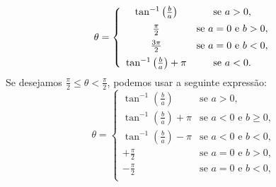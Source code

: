 \begin{equation}
\theta=\left\{\begin{array}{cc}\tan^{-1}\left(\frac{b}{a}\right)&\hbox{se}\ a>0, \\[5pt]
\frac{\pi}{2}&\hbox{se}\ a=0\ \hbox{e}\ b>0, \\[5pt]
\frac{3\pi}{2}&\hbox{se}\ a=0\ \hbox{e}\ b<0,  \\[5pt] 
\tan^{-1}\left(\frac{b}{a}\right)+\pi&\hbox{se}\ a<0.
\end{array}\right.
\end{equation}
Se desejamos $\frac{\pi}{2}\leq \theta < \frac{\pi}{2}$, podemos usar a seguinte expressão:
\begin{equation}\theta=\begin{cases}
\tan^{-1}(\frac b a) &\text{se } a > 0, \\[5pt]
\tan^{-1}(\frac b a) + \pi &\text{se } a < 0 \text{ e } b \ge 0, \\[5pt]
\tan^{-1}(\frac b a) - \pi &\text{se } a < 0 \text{ e } b < 0, \\[5pt]
+\frac{\pi}{2} &\text{se } a = 0 \text{ e } b > 0, \\[5pt]
-\frac{\pi}{2} &\text{se } a = 0 \text{ e } b < 0, \\[5pt]

\end{cases}
\end{equation}

